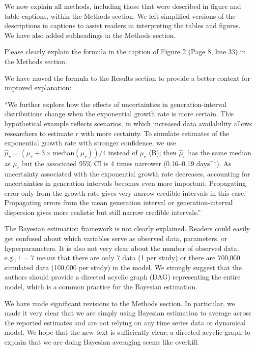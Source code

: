 \documentclass[12pt]{article}
\newcommand{\revtext}{\textsf}
\begin{document}
We now explain all methods, including those that were described in figure and table captions, within the Methods section.
We left simplified versions of the descriptions in captions to assist readers in interpreting the tables and figures.
We have also added subheadings in the Methods section.

\revtext{Please clearly explain the formula in the caption of Figure 2 (Page 8, line 33) in the Methods
section.}

We have moved the formula to the Results section to provide a better context for improved explanation: 

``We further explore how the effects of uncertainties in generation-interval distributions change when the exponential growth rate is more certain.
This hypothetical example reflects scenarios, in which increased data availability allows researchers to estimate $r$ with more certainty.
To simulate estimates of the exponential growth rate with stronger confidence, we use $\hat{\mu}_r = (\mu_r + 3\times\mathrm{median}(\mu_r))/4$ instead of $\mu_r$ (B); 
then $\hat{\mu}_r$ has the same median as $\mu_r$ but the associated 95\% CI is 4 times narrower (0.16--0.19 $\textrm{days}^{-1}$).
As uncertainty associated with the exponential growth rate decreases, accounting for uncertainties in generation intervals becomes even more important.
Propagating error only from the growth rate gives very narrow credible intervals in this case. 
Propagating errors from the mean generation interval or generation-interval dispersion gives more realistic but still narrow credible intervals.''

\revtext{The Bayesian estimation framework is not clearly explained. Readers could easily get confused
about which variables serve as observed data, parameters, or hyperparameters. It is also not
very clear about the number of observed data, e.g., i = 7 means that there are only 7 data (1 per
study) or there are 700,000 simulated data (100,000 per study) in the model. We strongly
suggest that the authors should provide a directed acyclic graph (DAG) representing the entire
model, which is a common practice for the Bayesian estimation.}

We have made significant revisions to the Methods section. 
In particular, we made it very clear that we are simply using Bayesian estimation to average across the reported estimates and are not relying on any time series data or dynamical model.
We hope that the new text is sufficiently clear; a directed acyclic graph to explain that we are doing Bayesian averaging seems like overkill.
\end{document}
